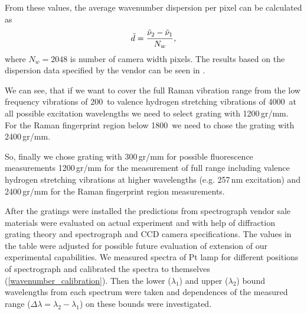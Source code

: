From these values, the average wavenumber dispersion per pixel can be
calculated as
\begin{equation}
	\bar{d} = \frac{\tilde{\nu}_2 - \tilde{\nu}_1}{N_w},
	\label{\eqnlabel{spectrograph_selection:dispersion_est}}
\end{equation}
where $N_w = 2048$ is number of camera width pixels.
The results based on the dispersion data specified by the vendor can be seen in
.

\begin{table}
	\centering
	
	\caption{Estimated Raman-shift ranges that can be captured by CCD detector
		for particular available excitation wavelengths.
		Gratings are denoted by number
		of grooves per mm, $\tilde{\nu}_1$ and $\tilde{\nu}_2$ are lowest and
		highest detected frequencies in \icm calculated according to
		\cref{%
			\eqnlabel{spectrograph_selection:spectral_range_max_est},%
			\eqnlabel{spectrograph_selection:spectral_range_min_est}%
		},
		respectively. The $\bar{d}$ denotes average dispersion in \icm/px
		calculated from
		.}
	\label{\tablabel{spectrograph_selection:dispersion_est}}
\end{table}

We can see, that if we want to cover the full Raman vibration range from the
low frequency vibrations of 200\,\icm{} to valence hydrogen stretching
vibrations of 4000\,\icm{} at all possible excitation wavelengths we need to
select grating with 1200\,gr/mm. For the Raman fingerprint region below
1800\,\icm{} we need to chose the grating with 2400\,gr/mm.

So, finally we chose grating with 300\,gr/mm for possible fluorescence
measurements 1200\,gr/mm for the measurement of full range including valence
hydrogen stretching vibrations at higher wavelengths (e.g. 257\,nm excitation)
and 2400\,gr/mm for the Raman fingerprint region measurements.

After the gratings were installed the predictions from spectrograph vendor
sale materials were evaluated on actual experiment and with help of
diffraction grating theory and spectrograph and CCD camera specifications.
The values in the table were adjusted for possible future evaluation of
extension of our experimental capabilities. We measured spectra of Pt lamp for
different positions of spectrograph and calibrated the spectra to themselves
(\cref{wavenumber_calibration}).
Then the lower ($\lambda_1$) and upper ($\lambda_2$) bound wavelengths from
each spectrum were taken and dependences of the measured range
($\Delta\lambda = \lambda_2 - \lambda_1$)
on these bounds were investigated.

